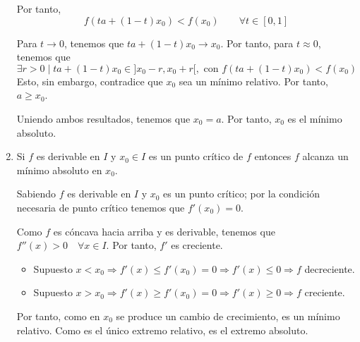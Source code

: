 \begin{ejercicio}
\begin{enumerate}
        Por tanto,
        \begin{equation*}
            f(ta + (1-t)x_0) < f(x_0)\qquad \forall t\in [0,1] 
        \end{equation*}

        Para $t\to 0$, tenemos que $ta + (1-t)x_0 \to x_0$. Por tanto, para $t\approx 0$, tenemos que
        \begin{equation*}
            \exists r>0 \mid ta+(1-t)x_0 \in ]x_0-r, x_0+r[, \text{ con }
            f(ta + (1-t)x_0) < f(x_0)
        \end{equation*}
        Esto, sin embargo, contradice que $x_0$ sea un mínimo relativo. Por tanto, $a\geq x_0$.

        Uniendo ambos resultados, tenemos que $x_0=a$. Por tanto, $x_0$ es el mínimo absoluto.

        \item Si $f$ es derivable en $I$ y $x_0 \in I$ es un punto crítico de $f$ entonces $f$ alcanza un mínimo absoluto en $x_0$.

        Sabiendo $f$ es derivable en $I$ y $x_0$ es un punto crítico; por la condición necesaria de punto crítico tenemos que $f'(x_0)=0$.

        Como $f$ es cóncava hacia arriba y es derivable, tenemos que $f''(x)>0 \quad \forall x\in I$. Por tanto, $f'$ es creciente.

        \begin{itemize}
            \item Supuesto $x<x_0 \Longrightarrow f'(x) \leq f'(x_0)=0 \Longrightarrow f'(x)\leq 0 \Longrightarrow f$ decreciente.

            \item Supuesto $x>x_0 \Longrightarrow f'(x) \geq f'(x_0)=0 \Longrightarrow f'(x)\geq 0 \Longrightarrow f$ creciente.
        \end{itemize}

        Por tanto, como en $x_0$ se produce un cambio de crecimiento, es un mínimo relativo. Como es el único extremo relativo, es el extremo absoluto.
        
    \end{enumerate}
\end{ejercicio}